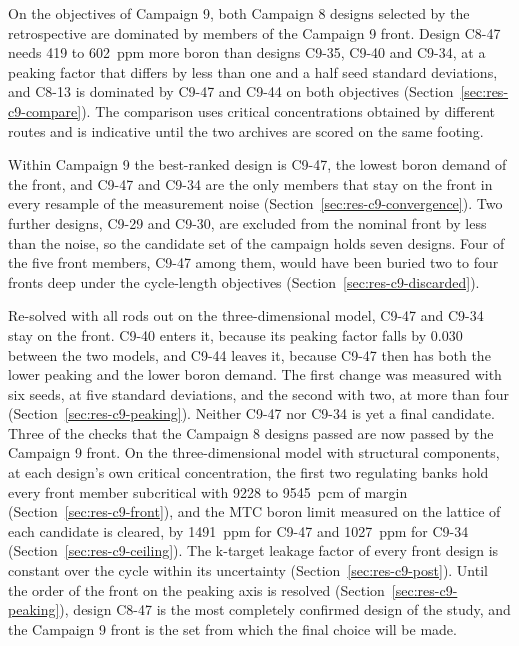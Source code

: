 On the objectives of Campaign 9, both Campaign 8 designs selected by
the retrospective are dominated by members of the Campaign 9 front.
Design C8-47 needs 419 to \SI{602}{ppm} more boron than
designs C9-35, C9-40 and C9-34, at a peaking factor that differs
by less than one and a half seed standard deviations, and C8-13 is
dominated by C9-47 and C9-44 on both objectives
(Section~\ref{sec:res-c9-compare}). The comparison uses critical
concentrations obtained by different routes and is indicative until the
two archives are scored on the same footing.

Within Campaign 9 the best-ranked design is C9-47, the lowest boron demand of the
front, and C9-47 and C9-34 are the only members that stay on the front
in every resample of the measurement noise
(Section~\ref{sec:res-c9-convergence}). Two further designs, C9-29 and
C9-30, are excluded from the nominal front by less than the noise, so the
candidate set of the campaign holds seven designs. Four of the five front
members, C9-47 among them, would have been buried two to four fronts deep
under the cycle-length objectives (Section~\ref{sec:res-c9-discarded}).

Re-solved with all rods out on the three-dimensional model, C9-47 and
C9-34 stay on the front. C9-40 enters it, because its peaking factor
falls by 0.030 between the two models, and C9-44 leaves it, because
C9-47 then has both the lower peaking and the lower boron demand. The
first change was measured with six seeds, at five standard deviations,
and the second with two, at more than four
(Section~\ref{sec:res-c9-peaking}). Neither C9-47 nor C9-34 is yet a final
candidate. Three of the checks that the Campaign 8 designs passed are now passed by
the Campaign 9 front. On the three-dimensional model with structural
components, at each design's own critical
concentration, the first two regulating banks hold every front member
subcritical with 9228 to \SI{9545}{pcm} of margin
(Section~\ref{sec:res-c9-front}), and the MTC boron limit measured on the
lattice of each candidate is cleared, by \SI{1491}{ppm} for C9-47 and
\SI{1027}{ppm} for C9-34 (Section~\ref{sec:res-c9-ceiling}). The k-target
leakage factor of every front design is constant over the cycle within its
uncertainty (Section~\ref{sec:res-c9-post}). Until the order of the front on the
peaking axis is resolved (Section~\ref{sec:res-c9-peaking}), design C8-47 is the most completely confirmed
design of the study, and the Campaign 9 front is the set from which the
final choice will be made.

